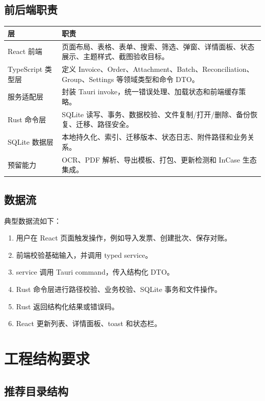 \documentclass[UTF8,zihao=-4]{ctexart}
\begin{document}
\subsection{前后端职责}

\begin{longtable}{p{3.2cm}p{11.2cm}}
\toprule
层 & 职责 \\
\midrule
React 前端 & 页面布局、表格、表单、搜索、筛选、弹窗、详情面板、状态展示、主题样式、截图验收目标。 \\
TypeScript 类型层 & 定义 Invoice、Order、Attachment、Batch、Reconciliation、Group、Settings 等领域类型和命令 DTO。 \\
服务适配层 & 封装 Tauri invoke，统一错误处理、加载状态和前端缓存策略。 \\
Rust 命令层 & SQLite 读写、事务、数据校验、文件复制/打开/删除、备份恢复、迁移、路径安全。 \\
SQLite 数据层 & 本地持久化、索引、迁移版本、状态日志、附件路径和业务关系。 \\
预留能力 & OCR、PDF 解析、导出模板、打包、更新检测和 InCase 生态集成。 \\
\bottomrule
\end{longtable}

\subsection{数据流}

典型数据流如下：

\begin{enumerate}
  \item 用户在 React 页面触发操作，例如导入发票、创建批次、保存对账。
  \item 前端校验基础输入，并调用 typed service。
  \item service 调用 Tauri command，传入结构化 DTO。
  \item Rust 命令层进行路径校验、业务校验、SQLite 事务和文件操作。
  \item Rust 返回结构化结果或错误码。
  \item React 更新列表、详情面板、toast 和状态栏。
\end{enumerate}

\section{工程结构要求}

\subsection{推荐目录结构}
\end{document}
